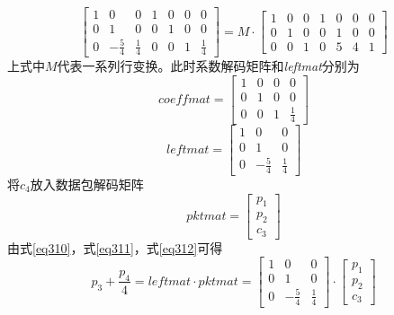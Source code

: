 \begin{equation}\label{eq39}
\left[ {\begin{array}{*{20}{c}}
	1&0&0&1&0&0&0\\
	0&1&0&0&1&0&0\\
	0&{ - \frac{5}{4}}&{\frac{1}{4}}&0&0&1&{\frac{1}{4}}
	\end{array}} \right] = M \cdot \left[ {\begin{array}{*{20}{c}}
	1&0&0&1&0&0&0\\
	0&1&0&0&1&0&0\\
	0&0&1&0&5&4&1
	\end{array}} \right]
\end{equation}
上式中$M$代表一系列行变换。此时系数解码矩阵和\emph{leftmat}分别为
\begin{equation}\label{eq310}
coeffmat = \left[ {\begin{array}{*{20}{c}}
	1&0&0&0\\
	0&1&0&0\\
	0&0&1&{\frac{1}{4}}
	\end{array}} \right]
\end{equation}
\begin{equation}\label{eq311}
	leftmat = \left[ {\begin{array}{*{20}{c}}
		1&0&0\\
		0&1&0\\
		0&{ - \frac{5}{4}}&{\frac{1}{4}}
		\end{array}} \right]
\end{equation}
将$c_{4}$放入数据包解码矩阵
\begin{equation}\label{eq312}
	pktmat=\left[ {\begin{array}{*{20}{c}}
		{{p_1}}\\
		{{p_2}}\\
		{{c_3}}
		\end{array}} \right]
\end{equation}
由式\ref{eq310}，式\ref{eq311}，式\ref{eq312}可得
\begin{equation}\label{eq313}
{p_3} +   \frac{{{p_4}}}{4} = leftmat \cdot pktmat = \left[ {\begin{array}{*{20}{c}}
	1&0&0\\
	0&1&0\\
	0&{ - \frac{5}{4}}&{\frac{1}{4}}
	\end{array}} \right] \cdot \left[ {\begin{array}{*{20}{c}}
	{{p_1}}\\
	{{p_2}}\\
	{{c_3}}
	\end{array}} \right]
\end{equation}
